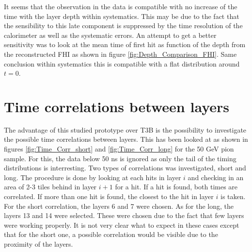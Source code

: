 It seems that the observation in the data is compatible with no increase of the time with the layer depth within systematics. This may be due to the fact that the sensibility to this late component is suppressed by the time resolution of the calorimeter as well as the systematic errors. An attempt to get a better sensitivity was to look at the mean time of first hit as function of the depth from the reconstructed FHI as shown in figure \ref{fig:Depth_Comparison_FHI}. Same conclusion within systematics this is compatible with a flat distribution around $t=0$.

\section{Time correlations between layers}

The advantage of this studied prototype over T3B is the possibility to investigate the possible time correlations between layers. This has been looked at as shown in figures \ref{fig:Time_Corr_short} and \ref{fig:Time_Corr_long} for the 50 GeV pion sample. For this, the data below 50 ns is ignored as only the tail of the timing distributions is interresting. Two types of correlations was investigated, short and long. The procedure is done by looking at each hits in layer $i$ and checking in an area of 2-3 tiles behind in layer $i+1$ for a hit. If a hit is found, both times are correlated. If more than one hit is found, the closest to the hit in layer $i$ is taken. For the short correlation, the layers 6 and 7 were chosen. As for the long, the layers 13 and 14 were selected. These were chosen due to the fact that few layers were working properly. It is not very clear what to expect in these cases except that for the short one, a possible correlation would be visible due to the proximity of the layers.

